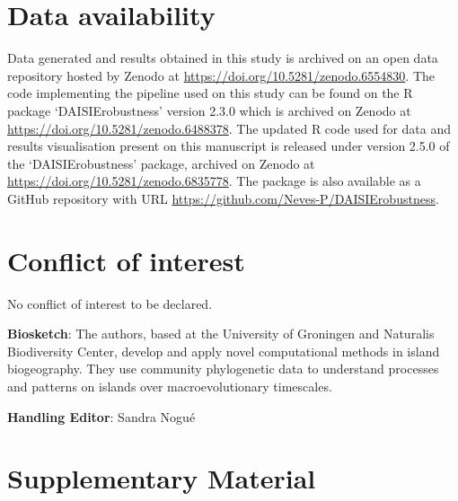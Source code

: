 \documentclass{article}
\begin{document}
\section*{Data availability}

Data generated and results obtained in this study is archived on an open data repository hosted by Zenodo at \url{https://doi.org/10.5281/zenodo.6554830}. The code implementing the pipeline used on this study can be found on the R package `DAISIErobustness' version 2.3.0 which is archived on Zenodo at \url{https://doi.org/10.5281/zenodo.6488378}. The updated R code used for data and results visualisation present on this manuscript is released under version 2.5.0 of the `DAISIErobustness' package, archived on Zenodo at \url{https://doi.org/10.5281/zenodo.6835778}. The package is also available as a GitHub repository with URL \url{https://github.com/Neves-P/DAISIErobustness}.

\section*{Conflict of interest}

No conflict of interest to be declared.





\noindent \textbf{Biosketch}: The authors, based at the University of Groningen and Naturalis Biodiversity Center, develop and apply novel computational methods in island biogeography. They use community phylogenetic data to understand processes and patterns on islands over macroevolutionary timescales.

\noindent \textbf{Handling Editor}: Sandra Nogué

\clearpage

\newcommand{\beginsupplement}{%
        \setcounter{table}{0}
        \renewcommand{\thetable}{S\arabic{table}}%
        \setcounter{figure}{0}
        \renewcommand{\thefigure}{S\arabic{figure}}%
     }
     
\beginsupplement
\section*{Supplementary Material}

\end{document}
